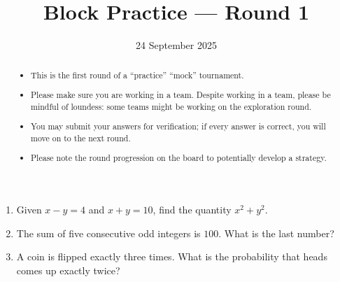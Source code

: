\documentclass{tufte-handout}
\title{Block Practice — Round 1}
\author[IA Math Team]{}
\date{24 September 2025}
\begin{document}
\maketitle

\begin{abstract}
\begin{itemize}
\item This is the first round of a ``practice'' ``mock'' tournament.
\item Please make sure you are working in a team. Despite working in a team, please be mindful of loundess: some teams might be working on the exploration round.
\item You may submit your answers for verification; if every answer is correct, you will move on to the next round.
\item Please note the round progression on the board to potentially develop a strategy.
\end{itemize}
\end{abstract}

\vspace{5em}

\begin{enumerate}
    \setlength{\itemsep}{10em}
    \item Given $x-y=4$ and $x+y=10$, find the quantity $x^2+y^2$.
    \item The sum of five consecutive odd integers is $100$. What is the last number?
    \item A coin is flipped exactly three times. What is the probability that heads comes up exactly twice?
\end{enumerate}
\end{document}
